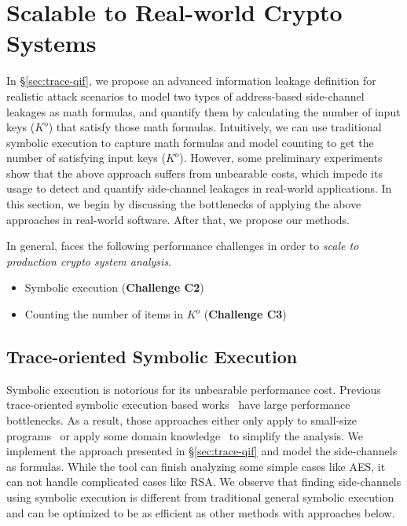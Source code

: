 \section{Scalable to Real-world Crypto Systems}
\label{sec:scala}

In \S\ref{sec:trace-qif}, we propose an advanced information leakage definition for
realistic attack scenarios to model two types of address-based side-channel
leakages as math formulas, and quantify them by calculating the number of input
keys ($K^o$) that satisfy those math formulas. Intuitively, we can use
traditional symbolic execution to capture math formulas and model counting
to get the number of satisfying input keys ($K^o$). However, some preliminary
experiments show that the above approach suffers from unbearable costs, which
impede its usage to detect and quantify side-channel leakages in real-world
applications. In this section, we begin by discussing the bottlenecks of
applying the above approaches in real-world software. After that, we
propose our methods.

In general, \tool{} faces the following performance challenges in
order to \emph{scale to production crypto system analysis}.
\begin{itemize}
      \item Symbolic execution (\textbf{Challenge C2})
      \item Counting the number of items in $K^o$ (\textbf{Challenge C3})
\end{itemize}

\subsection{Trace-oriented Symbolic Execution}
Symbolic execution is notorious for its unbearable performance cost. 
Previous trace-oriented
symbolic execution based
works~\cite{203878,Chattopadhyay:2017:QIL:3127041.3127044} have large
performance bottlenecks. As a result, those approaches either only apply to
small-size programs~\cite{Chattopadhyay:2017:QIL:3127041.3127044} or apply some
domain knowledge~\cite{Wang:2007:NCD:1250662.1250723} to simplify the analysis. 
We implement
the approach presented in \S\ref{sec:trace-qif} and model the side-channels as
formulas. While the tool can finish analyzing some simple cases like AES, it can
not handle complicated cases like RSA.
We observe that finding side-channels using symbolic execution is different from
traditional general symbolic execution and can be optimized to be as efficient
as other methods with approaches below.

